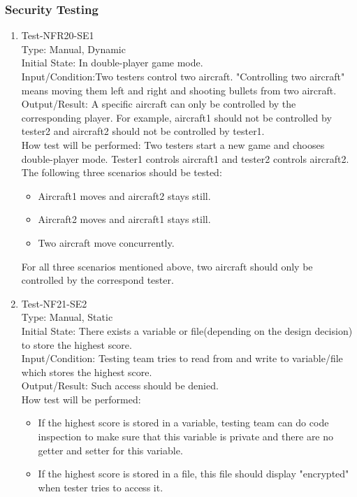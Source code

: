 \documentclass[12pt]{article}
\begin{document}
\subsubsection{Security Testing}
\begin{enumerate}[1.]
\item Test-NFR20-SE1\\
Type: Manual, Dynamic\\
Initial State: In double-player game mode.\\
Input/Condition:Two testers control two aircraft. "Controlling two aircraft" means moving them left and right and shooting bullets 
from two aircraft.\\
Output/Result: A specific aircraft can only 
be controlled by the corresponding player. For example, aircraft1 should not be controlled by 
tester2 and aircraft2 should not be controlled by 
tester1.\\
How test will be performed: Two testers start a 
new game and chooses double-player mode. Tester1 
controls aircraft1 and tester2 controls aircraft2. The following three scenarios should
be tested:
\begin{itemize}
\item Aircraft1 moves and aircraft2 stays still.
\item Aircraft2 moves and aircraft1 stays still.
\item Two aircraft move concurrently.
\end{itemize}
For all three scenarios mentioned above, two 
aircraft should only be controlled by the 
correspond tester.
\item Test-NF21-SE2\\
Type: Manual, Static\\
Initial State: There exists a variable or file(depending on the design decision) to store 
the highest score.\\
Input/Condition: Testing team tries to read from and write to variable/file which stores the highest score.\\
Output/Result: Such access should be denied.\\
How test will be performed: 
\begin{itemize}
\item If the highest score is stored in a variable,
testing team can do code inspection to make sure 
that this variable is private and there are no
getter and setter for this variable.
\item If the highest score is stored in a file, 
this file should display "encrypted" when tester 
tries to access it. 
\end{itemize}
\end{enumerate}
\end{document}
